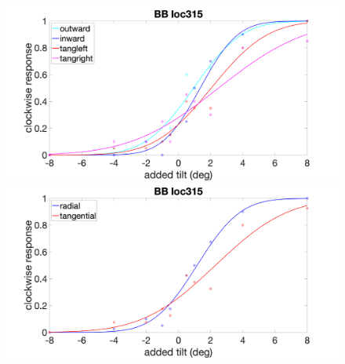 \documentclass[11pt]{article} %
\begin{document}
\begin{figure}[H]
\centering %
\includegraphics[scale=.15]{Images/BB_PF_loc315_4conds.png}
\includegraphics[scale=.15]{Images/BB_PF_loc315_2conds.png}
\end{figure}

\newpage
\end{document}
